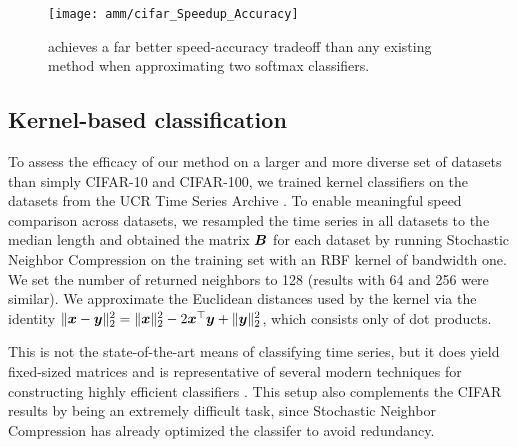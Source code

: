 \begin{figure}[h]
\begin{center}
\texttt{[image: amm/cifar\_Speedup\_Accuracy]}
\caption{\oursp achieves a far better speed-accuracy tradeoff than any existing method when approximating two softmax classifiers.}
\label{fig:cifar}
\end{center}
\end{figure}

\subsection{Kernel-based classification}

To assess the efficacy of our method on a larger and more diverse set of datasets than simply CIFAR-10 and CIFAR-100, we trained kernel classifiers on the datasets from the UCR Time Series Archive \cite{UCRArchive2018}. To enable meaningful speed comparison across datasets, we resampled the time series in all datasets to the median length and obtained the matrix $\bm{B}$ for each dataset by running Stochastic Neighbor Compression \cite{snc} on the training set with an RBF kernel of bandwidth one. We set the number of returned neighbors to 128 (results with 64 and 256 were similar). We approximate the Euclidean distances used by the kernel via the identity $\lVert\bm{x} - \bm{y}\rVert_2^2 = \lVert\bm{x}\rVert_2^2 - 2\bm{x}^\top \bm{y} + \lVert\bm{y}\rVert_2^2$, which consists only of dot products.

This is not the state-of-the-art means of classifying time series, but it does yield fixed-sized matrices and is representative of several modern techniques for constructing highly efficient classifiers \cite{snc,dsnc,bnc,protonn}. This setup also complements the CIFAR results by being an extremely difficult task, since Stochastic Neighbor Compression has already optimized the classifer to avoid redundancy.

